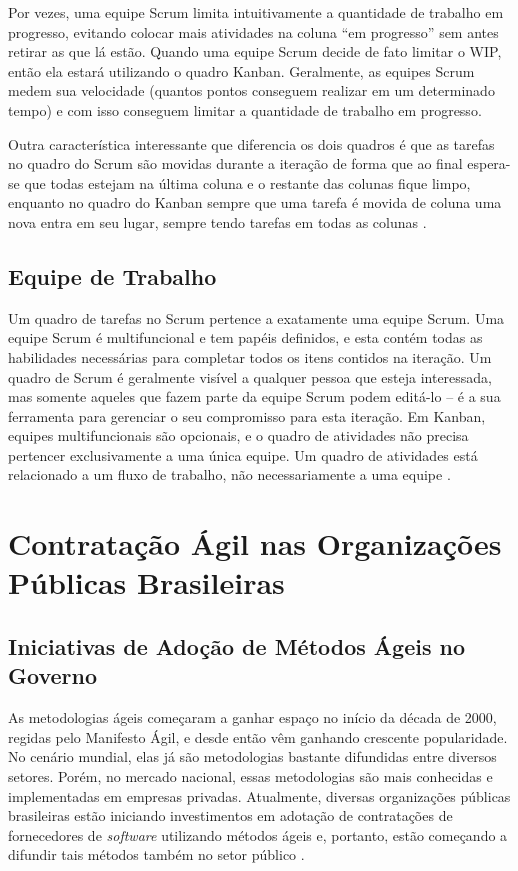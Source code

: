 Por vezes, uma equipe Scrum limita intuitivamente a quantidade de trabalho em progresso, evitando colocar mais atividades na coluna “em progresso” sem antes retirar as que lá estão. Quando uma equipe Scrum decide de fato limitar o WIP, então ela estará utilizando o quadro Kanban. Geralmente, as equipes Scrum medem sua velocidade (quantos pontos conseguem realizar em um determinado tempo) e com isso conseguem limitar a quantidade de trabalho em progresso.

Outra característica interessante que diferencia os dois quadros é que as tarefas no quadro do Scrum são movidas durante a iteração de forma que ao final espera-se que todas estejam na última coluna e o restante das colunas fique limpo, enquanto no quadro do Kanban sempre que uma tarefa é movida de coluna uma nova entra em seu lugar, sempre tendo tarefas em todas as colunas  \cite{kniberg2009}.

\subsection[Equipe de Trabalho]{Equipe de Trabalho}

Um quadro de tarefas no Scrum pertence a exatamente uma equipe Scrum. Uma equipe Scrum é multifuncional e tem papéis definidos, e esta contém todas as habilidades necessárias para completar todos os itens contidos na iteração. Um quadro de Scrum é geralmente visível a qualquer pessoa que esteja interessada, mas somente aqueles que fazem parte da equipe Scrum podem editá-lo – é a sua ferramenta para gerenciar o seu compromisso para esta iteração. Em Kanban, equipes multifuncionais são opcionais, e o quadro de atividades não precisa pertencer exclusivamente a uma única equipe. Um quadro de atividades está relacionado a um fluxo de trabalho, não necessariamente a uma equipe  \cite{kniberg2009}.

\section[Contratação Ágil nas Organizações Públicas Brasileiras]{Contratação Ágil nas Organizações Públicas Brasileiras}

\subsection[Iniciativas de Adoção de Métodos Ágeis no Governo]{Iniciativas de Adoção de Métodos Ágeis no Governo}

As metodologias ágeis começaram a ganhar espaço no início da década de 2000, regidas pelo Manifesto Ágil, e desde então vêm ganhando crescente popularidade. No cenário mundial, elas já são metodologias bastante difundidas entre diversos setores. Porém, no mercado nacional, essas metodologias são mais conhecidas e implementadas em empresas privadas. Atualmente, diversas organizações públicas brasileiras estão iniciando investimentos em adotação de contratações de fornecedores de \textit{software} utilizando métodos ágeis e, portanto, estão começando a difundir tais métodos também no setor público \cite{RTMAC}. 

